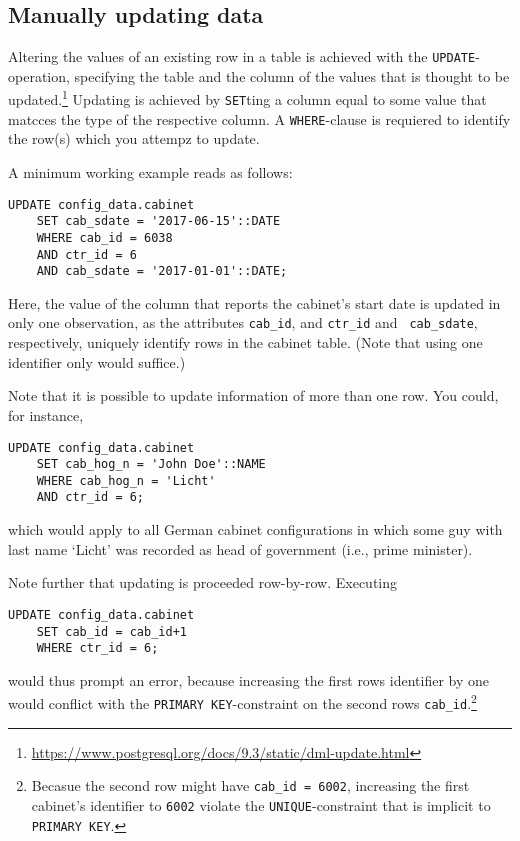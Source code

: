 \subsection{Manually updating data}\label{subsec_manually_updating_data}

Altering the values of an existing row in a table is achieved with the \texttt{UPDATE}-operation, specifying the table and the column of the values that is thought to be updated.\footnote{\url{https://www.postgresql.org/docs/9.3/static/dml-update.html}}
Updating is achieved by \texttt{SET}ting a column equal to some value that matcces the type of the respective column.
A \texttt{WHERE}-clause is requiered to identify the row(s) which you attempz to update. 

A minimum working example reads as follows:
\begin{lstlisting}[language=postgreSQL]
UPDATE config_data.cabinet 
	SET cab_sdate = '2017-06-15'::DATE 
	WHERE cab_id = 6038 
	AND ctr_id = 6 
	AND cab_sdate = '2017-01-01'::DATE;
\end{lstlisting}

Here, the value of the column that reports the cabinet's start date is updated in only one observation, as the attributes \texttt{cab\_id}, and \texttt{ctr\_id} and \texttt{ cab\_sdate}, respectively, uniquely identify rows in the cabinet table. (Note that using one identifier only would suffice.)

Note that it is possible to update information of more than one row. 
You could, for instance, 
\begin{lstlisting}[language=postgreSQL]
UPDATE config_data.cabinet 
	SET cab_hog_n = 'John Doe'::NAME 
	WHERE cab_hog_n = 'Licht'
	AND ctr_id = 6;
\end{lstlisting}
which would apply to all German cabinet configurations in which some guy with last name `Licht' was recorded as head of government (i.e., prime minister).

Note further that updating is proceeded row-by-row. Executing
\begin{lstlisting}[language=postgreSQL]
UPDATE config_data.cabinet 
	SET cab_id = cab_id+1
	WHERE ctr_id = 6;
\end{lstlisting}
would thus prompt an error, because increasing the first rows identifier by one would conflict with the \texttt{PRIMARY KEY}-constraint on the second rows \texttt{cab\_id}.\footnote{Becasue the second row might have \texttt{cab\_id = 6002}, increasing the first cabinet's identifier to \texttt{6002} violate the \texttt{UNIQUE}-constraint that is implicit to \texttt{PRIMARY KEY}.}

